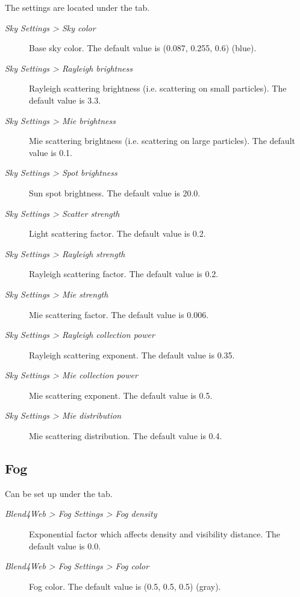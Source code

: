 \documentclass[a4paper,12pt,oneside]{sphinxmanual}
\begin{document}
The settings are located under the  tab.
\begin{description}
\item[{\emph{Sky Settings \textgreater{} Sky color}}] \leavevmode
Base sky color. The default value is (0.087, 0.255, 0.6) (blue).

\item[{\emph{Sky Settings \textgreater{} Rayleigh brightness}}] \leavevmode
Rayleigh scattering brightness (i.e. scattering on small particles). The default value is 3.3.

\item[{\emph{Sky Settings \textgreater{} Mie brightness}}] \leavevmode
Mie scattering brightness (i.e. scattering on large particles). The default value is 0.1.

\item[{\emph{Sky Settings \textgreater{} Spot brightness}}] \leavevmode
Sun spot brightness. The default value is 20.0.

\item[{\emph{Sky Settings \textgreater{} Scatter strength}}] \leavevmode
Light scattering factor. The default value is 0.2.

\item[{\emph{Sky Settings \textgreater{} Rayleigh strength}}] \leavevmode
Rayleigh scattering factor. The default value is 0.2.

\item[{\emph{Sky Settings \textgreater{} Mie strength}}] \leavevmode
Mie scattering factor. The default value is 0.006.

\item[{\emph{Sky Settings \textgreater{} Rayleigh collection power}}] \leavevmode
Rayleigh scattering exponent. The default value is 0.35.

\item[{\emph{Sky Settings \textgreater{} Mie collection power}}] \leavevmode
Mie scattering exponent. The default value is 0.5.

\item[{\emph{Sky Settings \textgreater{} Mie distribution}}] \leavevmode
Mie scattering distribution. The default value is 0.4.

\end{description}


\subsection{Fog}
\label{outdoor_rendering:id27}
Can be set up under the  tab.
\begin{description}
\item[{\emph{Blend4Web \textgreater{} Fog Settings \textgreater{} Fog density}}] \leavevmode
Exponential factor which affects density and visibility distance. The default value is 0.0.

\item[{\emph{Blend4Web \textgreater{} Fog Settings \textgreater{} Fog color}}] \leavevmode
Fog color. The default value is (0.5, 0.5, 0.5) (gray).

\end{description}
\end{document}
